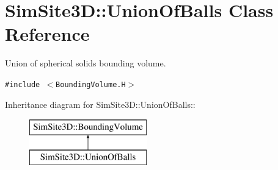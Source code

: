 \section{SimSite3D::Union\-Of\-Balls Class Reference}
\label{classSimSite3D_1_1UnionOfBalls}
Union of spherical solids bounding volume.  


{\tt \#include $<$Bounding\-Volume.H$>$}

Inheritance diagram for SimSite3D::Union\-Of\-Balls::\begin{figure}[H]
\begin{center}
\leavevmode
\includegraphics[height=2cm]{classSimSite3D_1_1UnionOfBalls}
\end{center}
\end{figure}
